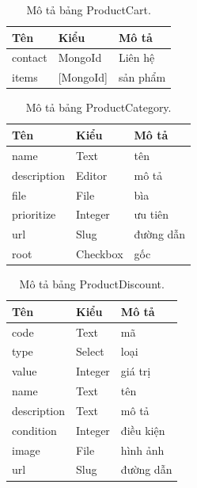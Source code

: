 \documentclass[11pt]{report}
\begin{document}
	
	\begin{table}[h!]
		\begin{center}
			\caption{Mô tả bảng ProductCart.}
			\begin{tabularx}{0.6\textwidth}{ |l|l|X| } 
				\hline
				Tên & Kiểu & Mô tả \\
				
				\hline
				contact & MongoId & Liên hệ\\
				items & [MongoId] & sản phẩm\\
				\hline
			\end{tabularx}
			\label{table:ProductCart}
		\end{center}
	\end{table}
	
	
	\begin{table}[h!]
		\begin{center}
			\caption{Mô tả bảng ProductCategory.}
			\begin{tabularx}{0.6\textwidth}{ |l|l|X| } 
				\hline
				Tên & Kiểu & Mô tả \\
				\hline
				name & Text & tên \\
				description & Editor & mô tả \\
				file & File & bìa \\
				prioritize & Integer & ưu tiên \\
				url & Slug & đường dẫn \\
				root & Checkbox & gốc \\
				\hline
			\end{tabularx}
			\label{table:ProductCategory}
		\end{center}
	\end{table}
	
	
	\begin{table}[h!]
		\begin{center}
			\caption{Mô tả bảng ProductDiscount.}
			\begin{tabularx}{0.6\textwidth}{ |l|l|X| } 
				\hline
				Tên & Kiểu & Mô tả \\
				\hline
				code & Text & mã \\
				type & Select & loại \\
				value & Integer & giá trị \\
				name & Text & tên \\
				description & Text & mô tả \\
				condition & Integer & điều kiện \\
				image & File & hình ảnh \\
				url & Slug & đường dẫn \\
				\hline
			\end{tabularx}
			\label{table:ProductDiscount}
		\end{center}
	\end{table}
	
\end{document}
